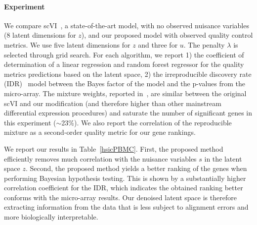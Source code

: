 \paragraph{Experiment} 
We compare scVI~\cite{Lopez292037}, a state-of-the-art model, with no observed nuisance variables ($8$ latent dimensions for $z$), and our proposed model with observed quality control metrics. We use five latent dimensions for $z$ and three for $u$. The penalty $\lambda$ is selected through grid search. For each algorithm, we report 1) the coefficient of determination of a linear regression and random forest regressor for the quality metrics predictions based on the latent space, 2) the irreproducible discovery rate (IDR)~\cite{Li2011} model between the Bayes factor of the model and the p-values from the micro-array. The mixture weights, reported in~\cite{Lopez292037}, are similar between the original scVI and our modification (and therefore higher than other mainstream differential expression procedures) and saturate the number of significant genes in this experiment ($\sim$23\%). We also report the correlation of the reproducible mixture as a second-order quality metric for our gene rankings. 

We report our results in Table~\ref{hsicPBMC}. First, the proposed method efficiently removes much correlation with the nuisance variables $s$ in the latent space $z$. Second, the proposed method yields a better ranking of the genes when performing Bayesian hypothesis testing. This is shown by a substantially higher correlation coefficient for the IDR, which indicates the obtained ranking better conforms with the micro-array results. Our denoised latent space is therefore extracting information from the data that is less subject to alignment errors and more biologically interpretable.

